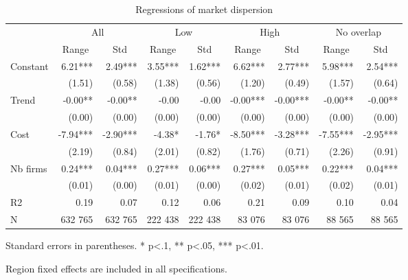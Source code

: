 \documentclass[english]{article}
\begin{document}
\begin{table}[H]
\caption{Regressions of market dispersion}
\label{tab:regs_market_dispersion_after}
\begin{threeparttable}
    \begin{tabular}{lrrrrrrrr}
    \toprule
    \toprule
          & \multicolumn{2}{c}{All} & \multicolumn{2}{c}{Low} & \multicolumn{2}{c}{High} & \multicolumn{2}{c}{No overlap} \\
          & \multicolumn{1}{c}{Range} & \multicolumn{1}{c}{Std} & \multicolumn{1}{c}{Range} & \multicolumn{1}{c}{Std} & \multicolumn{1}{c}{Range} & \multicolumn{1}{c}{Std} & \multicolumn{1}{c}{Range} & \multicolumn{1}{c}{Std} \\
    \midrule
    Constant & 6.21*** & 2.49*** & 3.55*** & 1.62*** & 6.62*** & 2.77*** & 5.98*** & 2.54*** \\
          & (1.51) & (0.58) & (1.38) & (0.56) & (1.20) & (0.49) & (1.57) & (0.64) \\
    Trend & -0.00** & -0.00** & -0.00 & -0.00 & -0.00*** & -0.00*** & -0.00** & -0.00** \\
          & (0.00) & (0.00) & (0.00) & (0.00) & (0.00) & (0.00) & (0.00) & (0.00) \\
    Cost  & -7.94*** & -2.90*** & -4.38* & -1.76* & -8.50*** & -3.28*** & -7.55*** & -2.95*** \\
          & (2.19) & (0.84) & (2.01) & (0.82) & (1.76) & (0.71) & (2.26) & (0.91) \\
    Nb firms & 0.24*** & 0.04*** & 0.27*** & 0.06*** & 0.27*** & 0.05*** & 0.22*** & 0.04*** \\
          & (0.01) & (0.00) & (0.01) & (0.00) & (0.02) & (0.01) & (0.02) & (0.01) \\
    \midrule
    R2    & 0.19  & 0.07  & 0.12  & 0.06  & 0.21  & 0.09  & 0.10  & 0.04 \\
    N     & 632 765 & 632 765 & 222 438 & 222 438 & 83 076 & 83 076 & 88 565 & 88 565 \\
\bottomrule
\bottomrule
\end{tabular}
\begin{tablenotes}
      \small
      \item Standard errors in parentheses. * p<.1, ** p<.05, *** p<.01.
      \item Region fixed effects are included in all specifications.
\end{tablenotes}
\end{threeparttable}
\end{table}
\end{document}
